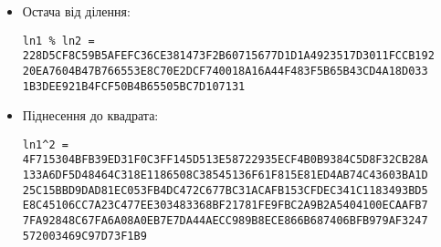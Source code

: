 \documentclass{article}
\begin{document}
\begin{itemize}
\item Остача від ділення:
\begin{verbatim}
ln1 % ln2 = 228D5CF8C59B5AFEFC36CE381473F2B60715677D1D1A4923517D3011FCCB192
20EA7604B47B766553E8C70E2DCF740018A16A44F483F5B65B43CD4A18D033
1B3DEE921B4FCF50B4B65505BC7D107131
\end{verbatim}

\item Піднесення до квадрата:
\begin{verbatim}
ln1^2 = 4F715304BFB39ED31F0C3FF145D513E58722935ECF4B0B9384C5D8F32CB28A
133A6DF5D48464C318E1186508C38545136F61F815E81ED4AB74C43603BA1D
25C15BBD9DAD81EC053FB4DC472C677BC31ACAFB153CFDEC341C1183493BD5
E8C45106CC7A23C477EE303483368BF21781FE9FBC2A9B2A5404100ECAAFB7
7FA92848C67FA6A08A0EB7E7DA44AECC989B8ECE866B687406BFB979AF3247
572003469C97D73F1B9
\end{verbatim}
\end{itemize}

\end{document}
